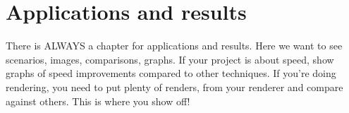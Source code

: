 
\ifx\isEmbedded\undefined

\graphicspath{{../img/}}

\fi

\chapter{Applications and results}
\label{chap:appres}

There is ALWAYS a chapter for applications and results. Here we want to see scenarios, images, comparisons, graphs. If your project is about speed, show graphs of speed improvements compared to other techniques. If you're doing rendering, you need to put plenty of renders, from your renderer and compare against others. This is where you show off!

\ifx\isEmbedded\undefined


\pagebreak

\fi